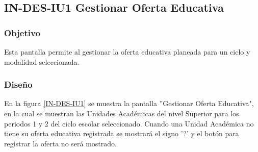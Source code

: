 \subsection{IN-DES-IU1 Gestionar Oferta Educativa}

\subsubsection{Objetivo}

Esta pantalla permite al  gestionar la oferta educativa planeada para un ciclo y modalidad seleccionada.

\subsubsection{Diseño}

En la figura \ref{IN-DES-IU1} se muestra la pantalla ''Gestionar Oferta Educativa", en la cual se muestran las Unidades Académicas del nivel Superior para los periodos 1 y 2 del ciclo escolar seleccionado. Cuando una Unidad Académica no tiene su oferta educativa registrada se mostrará el signo '?' y el botón para registrar la oferta no será mostrado.

